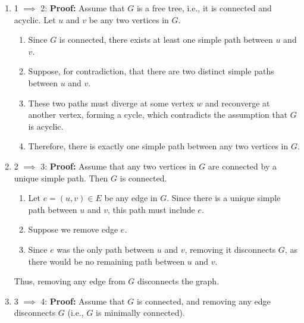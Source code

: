     \begin{derivation}
        \begin{enumerate}
            \item 1 $\implies$ 2:
            \textbf{Proof:} Assume that \( G \) is a free tree, i.e., it is connected and acyclic. Let \( u \) and \( v \) be any two vertices in \( G \).
            \begin{enumerate}
                \item Since \( G \) is connected, there exists at least one simple path between \( u \) and \( v \).
                \item Suppose, for contradiction, that there are two distinct simple paths between \( u \) and \( v \).
                \item These two paths must diverge at some vertex \( w \) and reconverge at another vertex, forming a cycle, which contradicts the assumption that \( G \) is acyclic.
                \item Therefore, there is exactly one simple path between any two vertices in \( G \).
            \end{enumerate}
            
            \item 2 $\implies$ 3:
            \textbf{Proof:} Assume that any two vertices in \( G \) are connected by a unique simple path. Then \( G \) is connected.
            \begin{enumerate}
                \item Let \( e = (u, v) \in E \) be any edge in \( G \). Since there is a unique simple path between \( u \) and \( v \), this path must include \( e \).
                \item Suppose we remove edge \( e \).
                \item Since \( e \) was the only path between \( u \) and \( v \), removing it disconnects \( G \), as there would be no remaining path between \( u \) and \( v \).
            \end{enumerate}
            Thus, removing any edge from \( G \) disconnects the graph.
        
            \item 3 $\implies$ 4:
            \textbf{Proof:} Assume that \( G \) is connected, and removing any edge disconnects \( G \) (i.e., \( G \) is minimally connected).
            

\end{enumerate}
\end{derivation}
